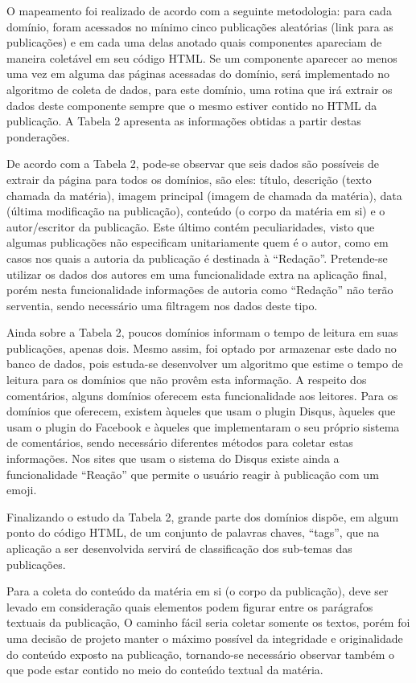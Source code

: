 \documentclass{article}
\begin{document}
O mapeamento foi realizado de acordo com a seguinte metodologia: para cada domínio, foram acessados no mínimo cinco publicações aleatórias (link para as publicações) e em cada uma delas anotado quais componentes apareciam de maneira coletável em seu código HTML. Se um componente aparecer ao menos uma vez em alguma das páginas acessadas do domínio, será implementado no algoritmo de coleta de dados, para este domínio, uma rotina que irá extrair os dados deste componente sempre que o mesmo estiver contido no HTML da publicação. A Tabela 2 apresenta as informações obtidas a partir destas ponderações.  


De acordo com a Tabela 2, pode-se observar que seis dados são possíveis de extrair da página para todos os domínios, são eles: título, descrição (texto chamada da matéria), imagem principal (imagem de chamada da matéria), data (última modificação na publicação), conteúdo (o corpo da matéria em si) e o autor/escritor da publicação. Este último contém peculiaridades, visto que algumas publicações não especificam unitariamente quem é o autor, como em casos nos quais a autoria da publicação é destinada à “Redação”. Pretende-se utilizar os dados dos autores em uma funcionalidade extra na aplicação final, porém nesta funcionalidade informações de autoria como “Redação” não terão serventia, sendo necessário uma filtragem nos dados deste tipo.

Ainda sobre a Tabela 2, poucos domínios informam o tempo de leitura em suas publicações, apenas dois. Mesmo assim, foi optado por armazenar este dado no banco de dados, pois estuda-se desenvolver um algoritmo que estime o tempo de leitura para os domínios que não provêm esta informação. A respeito dos comentários, alguns domínios oferecem esta funcionalidade aos leitores. Para os domínios que oferecem, existem àqueles que usam o plugin Disqus, àqueles que usam o plugin do Facebook e àqueles que implementaram o seu próprio sistema de comentários, sendo necessário diferentes métodos para coletar estas informações. Nos sites que usam o sistema do Disqus existe ainda a funcionalidade “Reação” que permite o usuário reagir à publicação com um emoji.

Finalizando o estudo da Tabela 2, grande parte dos domínios dispõe, em algum ponto do código HTML, de um conjunto de palavras chaves, “tags”, que na aplicação a ser desenvolvida servirá de classificação dos sub-temas das publicações.

Para a coleta do conteúdo da matéria em si (o corpo da publicação), deve ser levado em consideração quais elementos podem figurar entre os parágrafos textuais da publicação, O caminho fácil seria coletar somente os textos, porém foi uma decisão de projeto manter o máximo possível da integridade e originalidade do conteúdo exposto na publicação, tornando-se necessário observar também o que pode estar contido no meio do conteúdo textual da matéria. 
\end{document}
